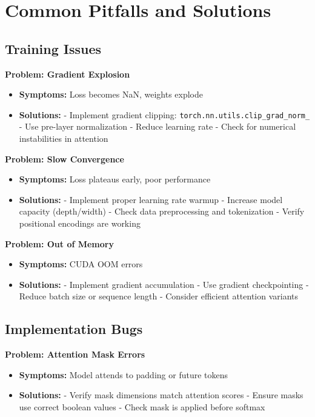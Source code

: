 
\section{Common Pitfalls and Solutions}

\subsection{Training Issues}

\textbf{Problem: Gradient Explosion}
\begin{itemize}
    \item \textbf{Symptoms:} Loss becomes NaN, weights explode
    \item \textbf{Solutions:}
        - Implement gradient clipping: \texttt{torch.nn.utils.clip\_grad\_norm\_}
        - Use pre-layer normalization
        - Reduce learning rate
        - Check for numerical instabilities in attention
\end{itemize}

\textbf{Problem: Slow Convergence}
\begin{itemize}
    \item \textbf{Symptoms:} Loss plateaus early, poor performance
    \item \textbf{Solutions:}
        - Implement proper learning rate warmup
        - Increase model capacity (depth/width)
        - Check data preprocessing and tokenization
        - Verify positional encodings are working
\end{itemize}

\textbf{Problem: Out of Memory}
\begin{itemize}
    \item \textbf{Symptoms:} CUDA OOM errors
    \item \textbf{Solutions:}
        - Implement gradient accumulation
        - Use gradient checkpointing
        - Reduce batch size or sequence length
        - Consider efficient attention variants
\end{itemize}

\subsection{Implementation Bugs}

\textbf{Problem: Attention Mask Errors}
\begin{itemize}
    \item \textbf{Symptoms:} Model attends to padding or future tokens
    \item \textbf{Solutions:}
        - Verify mask dimensions match attention scores
        - Ensure masks use correct boolean values
        - Check mask is applied before softmax
\end{itemize}


